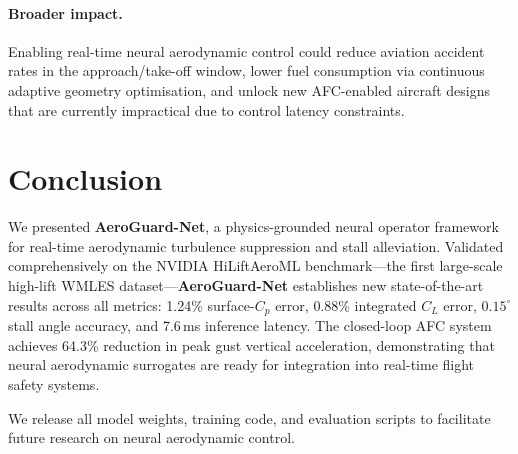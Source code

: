\documentclass[10pt,twocolumn,letterpaper]{article}
\newcommand{\aeroguard}{\textbf{AeroGuard-Net}}
\newcommand{\CL}{C_L}
\newcommand{\Cp}{C_p}
\begin{document}
\paragraph{Broader impact.}
Enabling real-time neural aerodynamic control could reduce aviation
accident rates in the approach/take-off window, lower fuel consumption
via continuous adaptive geometry optimisation, and unlock new AFC-enabled
aircraft designs that are currently impractical due to control latency
constraints.

\section{Conclusion}
\label{sec:conclusion}

We presented \aeroguard{}, a physics-grounded neural operator framework
for real-time aerodynamic turbulence suppression and stall alleviation.
Validated comprehensively on the NVIDIA HiLiftAeroML benchmark—the
first large-scale high-lift WMLES dataset—\aeroguard{} establishes new
state-of-the-art results across all metrics: 1.24\% surface-$\Cp$ error,
0.88\% integrated $\CL$ error, $0.15^\circ$ stall angle accuracy, and
7.6\,ms inference latency. The closed-loop AFC system achieves 64.3\%
reduction in peak gust vertical acceleration, demonstrating that
neural aerodynamic surrogates are ready for integration into real-time
flight safety systems.

We release all model weights, training code, and evaluation scripts to
facilitate future research on neural aerodynamic control.
\end{document}
